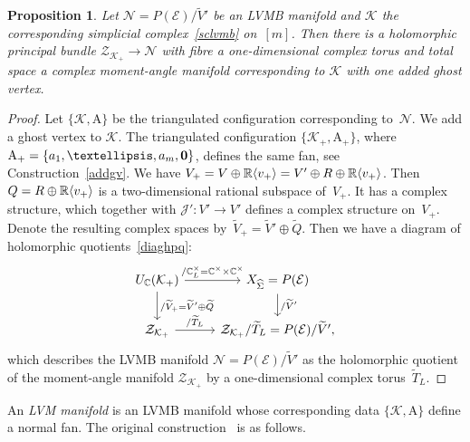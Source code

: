 \documentclass[a4paper]{amsart}
\newtheorem{proposition}[theorem]{Proposition}
\theoremstyle{definition}
\theoremstyle{remark}
\numberwithin{equation}{section}
\def\R{\mathbb R}
\def\C{\mathbb C}
\def\R{\mathbb R}
\def\sK{\mathcal K}
\newcommand{\mb}[1]{{\textbf {\textit#1}}}
\newcommand{\<}{\langle}
\renewcommand{\>}{\rangle}
\begin{document}
\begin{proposition}
Let $\mathcal N=P(\mathcal E)/\widetilde V'$ be an LVMB manifold and $\sK$ the corresponding simplicial complex~\eqref{sclvmb} on~$[m]$. Then there is a holomorphic principal bundle $\mathcal Z_{\sK_+}\to\mathcal N$ with fibre a one-dimensional complex torus and total space a complex moment-angle manifold corresponding to $\sK$ with one added ghost vertex.
\end{proposition}
\begin{proof}
Let $\{\sK,\mathrm A\}$ be the triangulated configuration corresponding to~$\mathcal N$. We add a ghost vertex to $\sK$. The triangulated configuration $\{\sK_+,\mathrm A_+\}$, where $\mathrm A_+=\{\mb a_1,\ldots,\mb a_m,\bf 0\}$, defines the same fan,  see Construction~\ref{addgv}. We have $V_+=V\oplus\R\langle\mb v_+\rangle=V'\oplus R\oplus\R\langle\mb v_+\rangle$. Then $Q=R\oplus\R\langle\mb v_+\rangle$ is a two-dimensional rational subspace of~$V_+$. It has a complex structure, which together with $\mathcal J'\colon V'\to V'$ defines a complex structure on~$V_+$. Denote the resulting complex spaces by~$\widetilde V_+=\widetilde V'\oplus\widetilde Q$. Then we have a diagram of holomorphic quotients~\eqref{diaghpq}:
\[
\begin{tikzcd}
  U_\C(\sK_+) \ar{r}{/\C^\times_L=\C^\times \times\C^\times} 
  \ar{d}{/\widetilde V_+=\widetilde V'\oplus\widetilde Q} 
   & X_{\widehat\Sigma}=P(\mathcal E) \ar{d}{/\widetilde V'}\\
  \mathcal Z_{\sK_+} \ar{r}{/\widetilde T_L} &  
  \mathcal Z_{\sK_+}/\widetilde T_L=P(\mathcal E)/\widetilde V',
\end{tikzcd}
\]
which describes the LVMB manifold $\mathcal N=P(\mathcal E)/\widetilde V'$ as the holomorphic quotient of the moment-angle manifold $\mathcal Z_{\sK_+}$ by a one-dimensional complex torus~$\widetilde T_L$.
\end{proof}

An \emph{LVM manifold} is an LVMB manifold whose corresponding data 
$\{\sK,\mathrm A\}$ define a normal fan. The original construction~\cite{meer00} is as follows.
\end{document}
